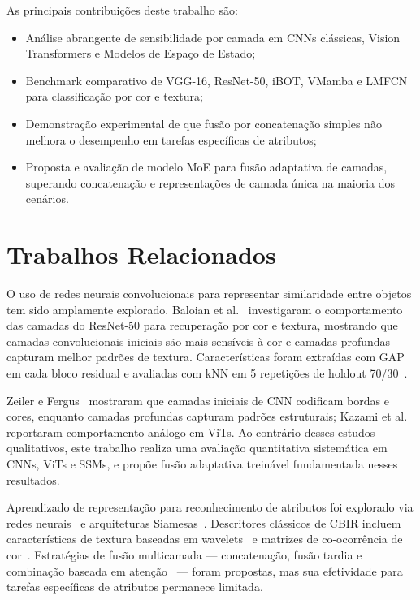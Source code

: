 \documentclass[conference]{IEEEtran}
\begin{document}
As principais contribui\c{c}\~{o}es deste trabalho s\~{a}o:
\begin{itemize}
  \item An\'{a}lise abrangente de sensibilidade por camada em CNNs
        cl\'{a}ssicas, Vision Transformers e Modelos de Espa\c{c}o de
        Estado;
  \item Benchmark comparativo de VGG-16, ResNet-50, iBOT, VMamba e LMFCN
        para classifica\c{c}\~{a}o por cor e textura;
  \item Demonstra\c{c}\~{a}o experimental de que fus\~{a}o por
        concatena\c{c}\~{a}o simples n\~{a}o melhora o desempenho em
        tarefas espec\'{i}ficas de atributos;
  \item Proposta e avalia\c{c}\~{a}o de modelo MoE para fus\~{a}o
        adaptativa de camadas, superando concatena\c{c}\~{a}o e
        representa\c{c}\~{o}es de camada \'{u}nica na maioria dos
        cen\'{a}rios.
\end{itemize}

\section{Trabalhos Relacionados}

O uso de redes neurais convolucionais para representar similaridade entre
objetos tem sido amplamente explorado.
Baloian et al.~\cite{b2} investigaram o comportamento das camadas do
ResNet-50 para recupera\c{c}\~{a}o por cor e textura, mostrando que
camadas convolucionais iniciais s\~{a}o mais sens\'{i}veis \`{a} cor e
camadas profundas capturam melhor padr\~{o}es de textura.
Caracter\'{i}sticas foram extra\'{i}das com GAP em cada bloco residual e
avaliadas com kNN em 5 repeti\c{c}\~{o}es de holdout 70/30~\cite{b3}.

Zeiler e Fergus~\cite{bzeiler} mostraram que camadas iniciais de CNN
codificam bordas e cores, enquanto camadas profundas capturam padr\~{o}es
estruturais; Kazami et al.~\cite{bkazami} reportaram comportamento
an\'{a}logo em ViTs.
Ao contr\'{a}rio desses estudos qualitativos, este trabalho realiza uma
avalia\c{c}\~{a}o quantitativa sistem\'{a}tica em CNNs, ViTs e SSMs, e
prop\~{o}e fus\~{a}o adaptativa trein\'{a}vel fundamentada nesses
resultados.

Aprendizado de representa\c{c}\~{a}o para reconhecimento de atributos
foi explorado via redes neurais~\cite{b10,b11} e arquiteturas
Siamesas~\cite{b8}.
Descritores cl\'{a}ssicos de CBIR incluem caracter\'{i}sticas de textura
baseadas em wavelets~\cite{b13} e matrizes de co-ocorr\^{e}ncia de
cor~\cite{b15}.
Estrat\'{e}gias de fus\~{a}o multicamada --- concatena\c{c}\~{a}o, fus\~{a}o
tardia e combina\c{c}\~{a}o baseada em aten\c{c}\~{a}o~\cite{b26,b27} ---
foram propostas, mas sua efetividade para tarefas espec\'{i}ficas de
atributos permanece limitada.
\end{document}
